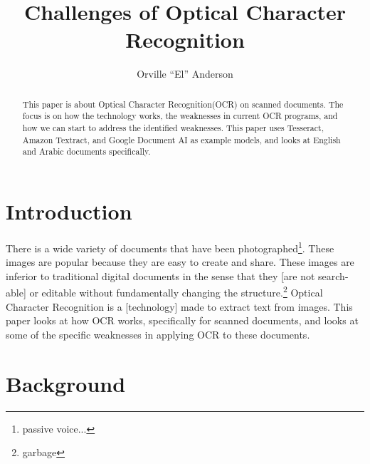\documentclass[sigplan,screen,nonacm]{acmart-tagged}
\begin{document}
\title{Challenges of Optical Character Recognition}
\author{Orville ``El'' Anderson}

\begin{abstract}
This paper is about Optical Character Recognition(OCR) on scanned documents. The focus is on how the technology works, the weaknesses in current OCR programs, and how we can start to address the identified weaknesses. This paper uses Tesseract, Amazon Textract, and Google Document AI as example models, and looks at English and Arabic documents specifically. 
\end{abstract}

\doclicenseThis



\maketitle

\section{Introduction}
\label{sec:introduction}

There is a wide variety of documents that have been photographed\footnote{passive voice...}. These images are popular because they are easy to create and share. These images are inferior to traditional digital documents in the sense that they [are not search-able] or editable without fundamentally changing the structure.\footnote{garbage} Optical Character Recognition is a [technology] made to extract text from images. This paper looks at how OCR works, specifically for scanned documents, and looks at some of the specific weaknesses in applying OCR to these documents.

\section{Background}
\label{sec:background}
\end{document}

